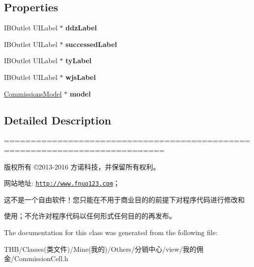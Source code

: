 \subsection*{Properties}
\begin{DoxyCompactItemize}
\item 
\mbox{\label{interface_commission_cell_a18ce959902d65860444d4f9d2c660dab}} 
I\+B\+Outlet U\+I\+Label $\ast$ {\bfseries ddz\+Label}
\item 
\mbox{\label{interface_commission_cell_af6acbba678bd21d7426e3aaf38106522}} 
I\+B\+Outlet U\+I\+Label $\ast$ {\bfseries successed\+Label}
\item 
\mbox{\label{interface_commission_cell_a949219bf9c2019b37f7ff136a22f674b}} 
I\+B\+Outlet U\+I\+Label $\ast$ {\bfseries ty\+Label}
\item 
\mbox{\label{interface_commission_cell_a96962fb0709de8ba67de52fc049dee7d}} 
I\+B\+Outlet U\+I\+Label $\ast$ {\bfseries wjs\+Label}
\item 
\mbox{\label{interface_commission_cell_af4c879de1b603c5f22b94ee5ca4b32f4}} 
\mbox{\hyperlink{interface_commissions_model}{Commissions\+Model}} $\ast$ {\bfseries model}
\end{DoxyCompactItemize}


\subsection{Detailed Description}
============================================================================

版权所有 ©2013-\/2016 方诺科技，并保留所有权利。

网站地址\+: \href{http://www.fnuo123.com}{\tt http\+://www.\+fnuo123.\+com}； 



这不是一个自由软件！您只能在不用于商业目的的前提下对程序代码进行修改和

使用；不允许对程序代码以任何形式任何目的的再发布。 

 

The documentation for this class was generated from the following file\+:\begin{DoxyCompactItemize}
\item 
T\+H\+B/\+Classes(类文件)/\+Mine(我的)/\+Others/分销中心/view/我的佣金/Commission\+Cell.\+h\end{DoxyCompactItemize}
